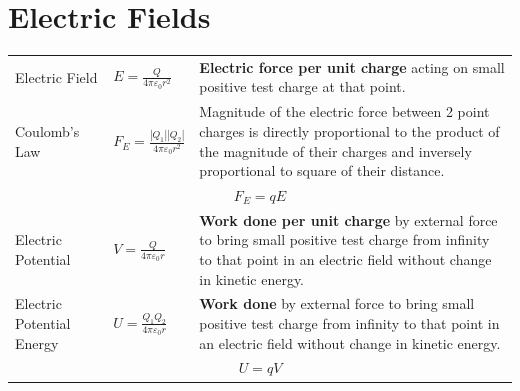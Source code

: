\documentclass[a4paper,11pt]{article}
\begin{document}
	\section{Electric Fields}
	\begin{center}
		\renewcommand{\arraystretch}{1.8}
		\begin{tabular}{@{} l l p{8.5cm} @{}}
			\toprule
			Electric Field & $\displaystyle E=\frac{Q}{4\pi \varepsilon_0 r^2}$ & \textbf{Electric force per unit charge} acting on small positive test charge at that point. \\
			Coulomb's Law & $\displaystyle F_E=\frac{|Q_1||Q_2|}{4\pi \varepsilon_0 r^2}$ & Magnitude of the electric force between 2 point charges is directly proportional to the product of the magnitude of their charges and inversely proportional to square of their distance.\\
			\multicolumn{3}{c}{$F_E=qE$} \\
			\midrule
			Electric Potential & $\displaystyle V = \frac{Q}{4\pi \varepsilon_0 r}$ & \textbf{Work done per unit charge} by external force to bring small positive test charge from infinity to that point in an electric field without change in kinetic energy. \\
			Electric Potential Energy & $\displaystyle U = \frac{Q_1 Q_2}{4\pi \varepsilon_0 r}$ & \textbf{Work done } by external force to bring small positive test charge from infinity to that point in an electric field without change in kinetic energy.\\
			\multicolumn{3}{c}{$U=qV$} \\
			\bottomrule
		\end{tabular}
	\end{center}
	
	\newpage
\end{document}
